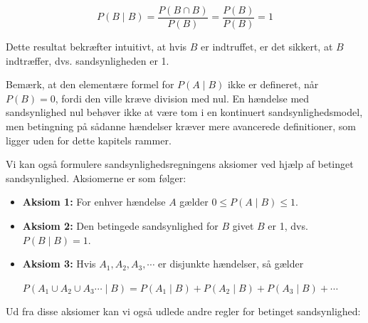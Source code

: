 \[
P(B \mid B) = \frac{P(B \cap B)}{P(B)} = \frac{P(B)}{P(B)} = 1
\]

Dette resultat bekræfter intuitivt, at hvis \( B \) er indtruffet, er det sikkert, at \( B \) indtræffer, dvs. sandsynligheden er 1.

Bemærk, at den elementære formel for \( P(A \mid B) \) ikke er defineret, når \( P(B) = 0 \), fordi den ville kræve division med nul. En hændelse med sandsynlighed nul behøver ikke at være tom i en kontinuert sandsynlighedsmodel, men betingning på sådanne hændelser kræver mere avancerede definitioner, som ligger uden for dette kapitels rammer.

Vi kan også formulere sandsynlighedsregningens aksiomer ved hjælp af betinget sandsynlighed. Aksiomerne er som følger:

\begin{axiom}
    \begin{itemize}
        \item \textbf{Aksiom 1:} For enhver hændelse \(A\) gælder \( 0 \leq P(A\mid B) \leq 1 \).
        \item \textbf{Aksiom 2:} Den betingede sandsynlighed for $B$ givet $B$ er 1, dvs. $P(B \mid B)=1$.
        \item \textbf{Aksiom 3:} Hvis \(A_1, A_2, A_3, \cdots\) er disjunkte hændelser, så gælder
         
        \hspace*{2.8em}$P\left(A_1 \cup A_2 \cup A_3 \cdots \mid B\right)=P\left(A_1 \mid B\right)+P\left(A_2 \mid B\right)+P\left(A_3 \mid B\right)+\cdots$
    \end{itemize}
\end{axiom}

Ud fra disse aksiomer kan vi også udlede andre regler for betinget sandsynlighed:

